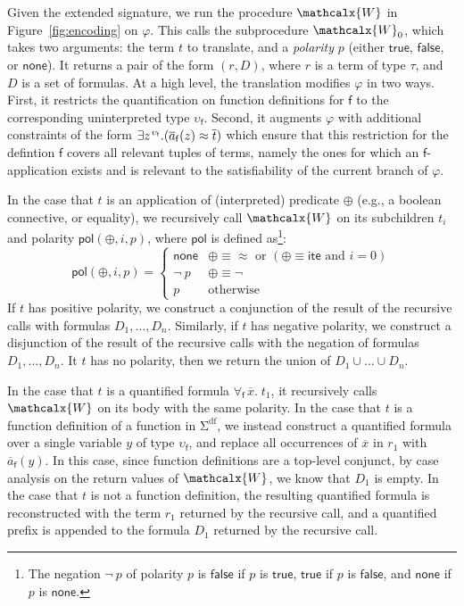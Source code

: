 \documentclass[runningheads,a4paper]{llncs}
\newcommand{\con}[1]{\mathsf{#1}}
\renewcommand\vec[1]{\overline{#1}}
\let\oldSigma=\Sigma
\def\Sigma{\mathrm{\oldSigma}}
\let\oldneg=\neg
\def\neg{\oldneg\:}
\newcommand{\teq}{\approx}
\newcommand{\conv}{\mathcalx{W}}
\newcommand{\sfundefs}[1]{#1^\mathrm{df}}
\newcommand{\pnone}{\con{none}}
\newcommand{\ptrue}{\con{true}}
\newcommand{\pfalse}{\con{false}}
\newcommand{\pol}{\con{pol}}
\newcommand{\lite}{\con{ite}}
\newcommand{\boolop}{\oplus}
\newcommand{\forallf}[1]{\forall_{\!#1\:}}
\newcommand{\vecfarg}[1]{\vec{a}_{#1}}
\newcommand{\fargsort}[1]{\upsilon_{#1}}
\newcommand{\vthinspace}{\kern+0.083333em}
\newcommand{\typ}[1]{^{\vthinspace #1}}
\begin{document}
Given the extended signature, we run the procedure $\conv$ in Figure~\ref{fig:encoding} on $\varphi$.
This calls the subprocedure $\conv_0$, which takes two arguments: the term $t$ to translate, and a \emph{polarity} $p$ (either $\ptrue$, $\pfalse$, or $\pnone$).
It returns a pair of the form $( r, D )$, where $r$ is a term of type $\tau$, and $D$ is a set of formulas.
At a high level, the translation modifies $\varphi$ in two ways.
First, it restricts the quantification on function definitions for $\con{f}$ to the corresponding uninterpreted type $\fargsort{\con{f}}$.
Second, it augments $\varphi$ with additional constraints of the form $\exists z\typ{\fargsort{\con{f}}}. ( \vecfarg{\con{f}}( z ) \teq \vec t )$
which ensure that this restriction for the defintion $\con{f}$ covers all relevant tuples of terms,
namely the ones for which an $\con{f}$-application exists and is relevant to the satisfiability of the current branch of $\varphi$.

In the case that $t$ is an application of (interpreted) predicate $\boolop$ (e.g., a boolean connective, or equality),
we recursively call $\conv$ on its subchildren $t_i$ and polarity $\pol( \boolop, i, p )$, where $\pol$ is defined as\footnote{The negation $\neg p$ of polarity $p$ is 
$\pfalse$ if $p$ is $\ptrue$,
$\ptrue$ if $p$ is $\pfalse$, and
$\pnone$ if $p$ is $\pnone$.}:
\begin{equation*}
\pol( \boolop, i, p ) = \begin{cases}
                         \pnone & \boolop \equiv \teq \text{ or } ( \boolop \equiv \lite \text{ and } i=0 ) \\
                         \neg p & \boolop \equiv \neg \\
                         p & \text{otherwise}
                         \end{cases}
\end{equation*}
If $t$ has positive polarity,
we construct a conjunction of the result of the recursive calls with formulas $D_1, \ldots, D_n$.
Similarly, if $t$ has negative polarity,
we construct a disjunction of the result of the recursive calls with the negation of formulas $D_1, \ldots, D_n$.
It $t$ has no polarity,
then we return the union of $D_1 \cup \ldots \cup D_n$.

In the case that $t$ is a quantified formula $\forallf{\con{f}} \vec x.\; t_1$, it recursively calls $\conv$ on its body with the same polarity.
In the case that $t$ is a function definition of a function in $\sfundefs{\Sigma}$,
we instead construct a quantified formula over a single variable $y$ of type $\fargsort{\con{f}}$,
and replace all occurrences of $\vec x$ in $r_1$ with $\vecfarg{\con{f}}( y )$.
In this case, since function definitions are a top-level conjunct, by case analysis on the return values of $\conv$, we know that $D_1$ is empty.
In the case that $t$ is not a function definition, 
the resulting quantified formula is reconstructed with the term $r_1$ returned by the recursive call,
and a quantified prefix is appended to the formula $D_1$ returned by the recursive call.
\end{document}
